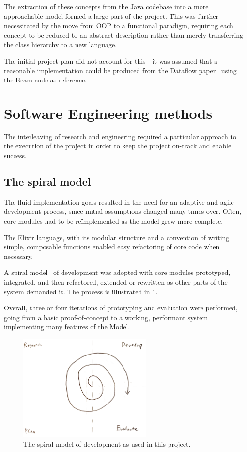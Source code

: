 The extraction of these concepts from the Java codebase into a more approachable model formed a large part of the project.
This was further necessitated by the move from OOP to a functional paradigm, requiring each concept to be reduced to an abstract description rather than merely transferring the class hierarchy to a new language.

The initial project plan did not account for this---it was assumed that a reasonable implementation could be produced from the Dataflow paper~\cite{Akidau:2015} using the Beam code as reference.

\section{Software Engineering methods}\label{sec:prep:softeng}

The interleaving of research and engineering required a particular approach to the execution of the project in order to keep the project on-track and enable success.

\subsection{The spiral model}\label{sec:prep:softeng:spiral}

The fluid implementation goals resulted in the need for an adaptive and agile development process, since initial assumptions changed many times over.
Often, core modules had to be re\"implemented as the model grew more complete.

The Elixir language, with its modular structure and a convention of writing simple, composable functions enabled easy refactoring of core code when necessary.

A spiral model~\cite{Boehm:1986} of development was adopted with core modules prototyped, integrated, and then refactored, extended or rewritten as other parts of the system demanded it.
The process is illustrated in \cref{fig:prep:spiral-model}.

Overall, three or four iterations of prototyping and evaluation were performed, going from a basic proof-of-concept to a working, performant system implementing many features of the Model.

\begin{figure}[h]
	\centering
	\includegraphics[width=0.6\textwidth]{images/temp/spiral}
	\caption{The spiral model of development as used in this project.}
	\label{fig:prep:spiral-model}
\end{figure}


